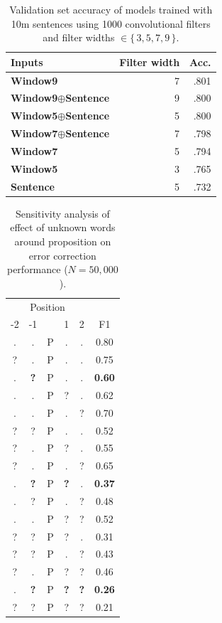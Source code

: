 \begin{frame}
\begin{table}
\centering
\begin{tabular}{lrr}
\hline
Inputs & Filter width & Acc. \\
\hline
\textbf{Window9} & 7 &  .801 \\
\textbf{Window9}$\oplus$\textbf{Sentence} & 9 &  .800 \\
\textbf{Window5}$\oplus$\textbf{Sentence} & 5 &  .800 \\
\textbf{Window7}$\oplus$\textbf{Sentence} & 7 &  .798  \\
\textbf{Window7} & 5 &  .794 \\
\textbf{Window5} & 3 &  .765 \\
\textbf{Sentence} & 5 &  .732 \\
\hline
\end{tabular}
\caption{Validation set accuracy of models trained with 10m sentences using 1000 convolutional filters and filter widths $\in \{\, 3,5,7,9 \,\}$.}
\end{table}
\end{frame}

\begin{frame}
\begin{table}
\centering
\small
\begin{tabular}{cccccc}
\multicolumn{5}{c}{Position} & \\
\cline{1-5} 
-2 & -1 & & 1 & 2 & F1 \\
\hline
. & . & P & . & . & 0.80 \\
\hline
? & . & P & . & . & 0.75 \\
. & \textbf{?} & P & . & . & \textbf{0.60} \\
. & . & P & ? & . & 0.62 \\
. & . & P & . & ? & 0.70 \\
\hline
? & ? & P & . & . & 0.52 \\
? & . & P & ? & . & 0.55 \\
? & . & P & . & ? & 0.65 \\
. & \textbf{?} & P & \textbf{?} & . & \textbf{0.37} \\
. & ? & P & . & ? & 0.48 \\
. & . & P & ? & ? & 0.52 \\
\hline
? & ? & P & ? & . & 0.31 \\
? & ? & P & . & ? & 0.43 \\
? & . & P & ? & ? & 0.46 \\
. & \textbf{?} & P & \textbf{?} & \textbf{?} & \textbf{0.26} \\
\hline
? & ? & P & ? & ? & 0.21 \\
\hline
\end{tabular}
\caption{Sensitivity analysis of effect of unknown words around proposition on error correction performance ($N = 50,000$).}
\end{table}
\end{frame}

